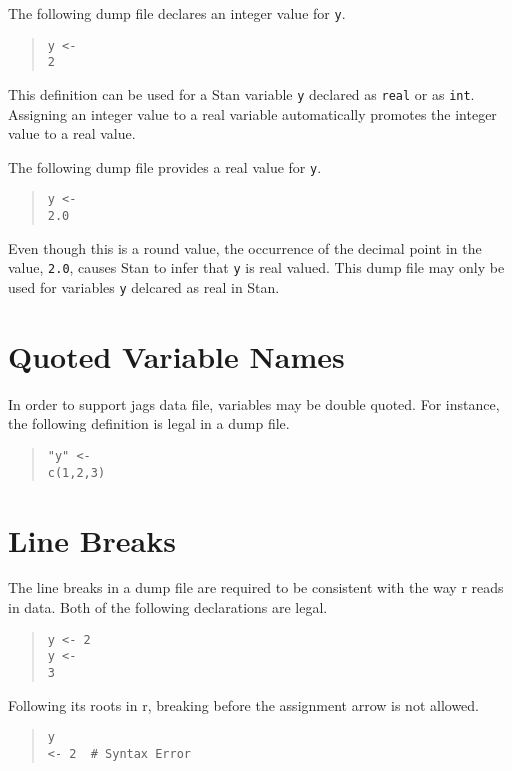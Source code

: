 \documentclass[10pt]{report}
\newcommand{\Stan}{Stan\xspace}
\newcommand{\acronym}[1]{{\sc #1}\xspace}
\newcommand{\R}{\acronym{r}}
\newcommand{\JAGS}{\acronym{jags}}
\newcommand{\code}[1]{{\tt #1}}
\begin{document}
The following dump file declares an integer value for \code{y}.
%
\begin{quote}
\begin{Verbatim} 
y <- 
2
\end{Verbatim}
\end{quote}
% 
This definition can be used for a \Stan variable \code{y} declared as
\code{real} or as \code{int}.  Assigning an integer value to a real
variable automatically promotes the integer value to a real value.

The following dump file provides a real value for \code{y}.
%
\begin{quote}
\begin{Verbatim}
y <-
2.0
\end{Verbatim}
\end{quote}
%
Even though this is a round value, the occurrence of the decimal
point in the value, \code{2.0}, causes \Stan to infer that \code{y} is
real valued.  This dump file may only be used for variables \code{y}
delcared as real in \Stan.


\section{Quoted Variable Names}

In order to support \JAGS data file, variables may be double quoted.
For instance, the following definition is legal in a dump file.
%
\begin{quote}
\begin{Verbatim}
"y" <-
c(1,2,3)
\end{Verbatim}
\end{quote}

\section{Line Breaks}

The line breaks in a dump file are required to be consistent with
the way \R reads in data.  Both of the following declarations are
legal.
%
\begin{quote}
\begin{Verbatim}
y <- 2
y <-
3
\end{Verbatim}
\end{quote}
%
Following its roots in \R, breaking before the assignment arrow is not
allowed.
%
\begin{quote}
\begin{Verbatim}
y
<- 2  # Syntax Error
\end{Verbatim}
\end{quote}
\end{document}
